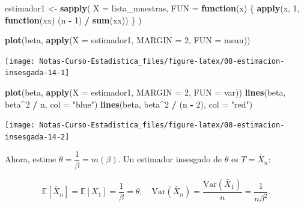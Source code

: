 \documentclass[
  12pt,
]{book}
\newenvironment{Shaded}{\begin{snugshade}}{\end{snugshade}}
\newcommand{\ControlFlowTok}[1]{\textcolor[rgb]{0.13,0.29,0.53}{\textbf{#1}}}
\newcommand{\DataTypeTok}[1]{\textcolor[rgb]{0.13,0.29,0.53}{#1}}
\newcommand{\DecValTok}[1]{\textcolor[rgb]{0.00,0.00,0.81}{#1}}
\newcommand{\KeywordTok}[1]{\textcolor[rgb]{0.13,0.29,0.53}{\textbf{#1}}}
\newcommand{\NormalTok}[1]{#1}
\newcommand{\OperatorTok}[1]{\textcolor[rgb]{0.81,0.36,0.00}{\textbf{#1}}}
\newcommand{\StringTok}[1]{\textcolor[rgb]{0.31,0.60,0.02}{#1}}
\begin{document}
\begin{Shaded}
\begin{Highlighting}[]
\NormalTok{estimador1 \textless{}{-}}\StringTok{ }\KeywordTok{sapply}\NormalTok{(}
  \DataTypeTok{X =}\NormalTok{ lista\_muestras,}
  \DataTypeTok{FUN =} \ControlFlowTok{function}\NormalTok{(x) \{}
    \KeywordTok{apply}\NormalTok{(x, }\DecValTok{1}\NormalTok{, }\ControlFlowTok{function}\NormalTok{(xx) (n }\OperatorTok{{-}}\StringTok{ }\DecValTok{1}\NormalTok{) }\OperatorTok{/}\StringTok{ }\KeywordTok{sum}\NormalTok{(xx))}
\NormalTok{  \}}
\NormalTok{)}

\KeywordTok{plot}\NormalTok{(beta, }\KeywordTok{apply}\NormalTok{(}\DataTypeTok{X =}\NormalTok{ estimador1, }\DataTypeTok{MARGIN =} \DecValTok{2}\NormalTok{, }\DataTypeTok{FUN =}\NormalTok{ mean))}
\end{Highlighting}
\end{Shaded}

\begin{center}\texttt{[image: Notas-Curso-Estadistica\_files/figure-latex/08-estimacion-insesgada-14-1]} \end{center}

\begin{Shaded}
\begin{Highlighting}[]
\KeywordTok{plot}\NormalTok{(beta, }\KeywordTok{apply}\NormalTok{(}\DataTypeTok{X =}\NormalTok{ estimador1, }\DataTypeTok{MARGIN =} \DecValTok{2}\NormalTok{, }\DataTypeTok{FUN =}\NormalTok{ var))}
\KeywordTok{lines}\NormalTok{(beta, beta}\OperatorTok{\^{}}\DecValTok{2} \OperatorTok{/}\StringTok{ }\NormalTok{n, }\DataTypeTok{col =} \StringTok{"blue"}\NormalTok{)}
\KeywordTok{lines}\NormalTok{(beta, beta}\OperatorTok{\^{}}\DecValTok{2} \OperatorTok{/}\StringTok{ }\NormalTok{(n }\OperatorTok{{-}}\StringTok{ }\DecValTok{2}\NormalTok{), }\DataTypeTok{col =} \StringTok{"red"}\NormalTok{)}
\end{Highlighting}
\end{Shaded}

\begin{center}\texttt{[image: Notas-Curso-Estadistica\_files/figure-latex/08-estimacion-insesgada-14-2]} \end{center}

Ahora, estime \(\theta = \dfrac 1\beta = m(\beta)\). Un estimador insesgado de \(\theta\) es \(T =\bar X_n\):

\[\mathbb E[\bar X_n] = \mathbb E
[X_1] = \dfrac 1\beta  = \theta, \quad \text{Var}(\bar X_n) = \dfrac{\text{Var}(\bar X_1) }{n} = \dfrac 1{n\beta^2}.\]
\end{document}

